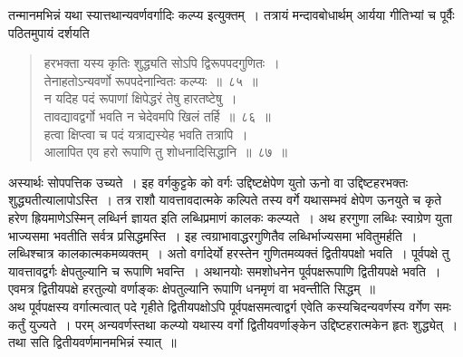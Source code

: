 \documentclass[11pt, openany]{book}
\begin{document}
\vspace{-3mm}
 तन्मानमभिन्नं यथा स्यात्तथान्यवर्णवर्गादिः कल्प्य इत्युक्तम्~। 
तत्रायं मन्दावबोधार्थम् आर्यया गीतिभ्यां च पूर्वैः पठितमुपायं दर्शयति\textendash 
 \begin{quote}
     \bs
      हरभक्ता यस्य कृतिः शुद्ध्यति सोऽपि द्विरूपपदगुणितः~। \\
 तेनाहतोऽन्यवर्णो रूपपदेनान्वितः कल्प्यः~॥~८५~॥~\\

\vspace{-5mm}
 न यदिह पदं रूपाणां क्षिपेद्धरं तेषु हारतष्टेषु~। \\
 तावद्यावद्वर्गो भवति न चेदेवमपि खिलं तर्हि~॥~८६~॥~\\

\vspace{-5mm}
 हत्वा क्षिप्त्वा च पदं यत्राद्यस्येह भवति तत्रापि~। \\
 आलापित एव हरो रूपाणि तु शोधनादिसिद्धानि~॥~८७~॥~
 \end{quote}

अस्यार्थः सोपपत्तिक उच्यते~। इह वर्गकुट्टके को वर्गः उद्दिष्टक्षेपेण
युतो ऊनो वा उद्दिष्टहरभक्तः शुद्ध्यतीत्यालापोऽस्ति~। तत्र राशौ 
यावत्तावदात्मके कल्पिते तस्य वर्गे यथासम्भवं क्षेपेण ऊनयुते च कृते 
हरेण ह्रियमाणेऽस्मिन् लब्धिर्न ज्ञायत इति लब्धिप्रमाणं कालकः 
कल्प्यते~। अथ हरगुणा लब्धिः स्वाग्रेण युता भाज्यसमा भवतीति 
सर्वत्र प्रसिद्धमस्ति~। इह त्वग्राभावाद्धरगुणितैव लब्धिर्भाज्यसमा भवितुमर्हति~। 
लब्धिश्चात्र कालकात्मकमव्यक्तम्~। अतो वर्गादेर्यो हरस्तेन गुणितमव्यक्तं
द्वितीयपक्षो भवति~। पूर्वपक्षे तु यावत्तावद्वर्गः क्षेपतुल्यानि च रूपाणि
भवन्ति~। अथानयोः समशोधनेन पूर्वपक्षरूपाणि द्वितीयपक्षे भवति~। एवमत्र
\newpage
\noindent द्वितीयपक्षे हरतुल्यो वर्णाङ्कः क्षेपतुल्यानि रूपाणि धनमृणं वा भवन्तीति
सिद्धम्~॥ \\

 \vspace{-3mm}
 अथ पूर्वपक्षस्य वर्गात्मत्वात् पदे गृहीते द्वितीयपक्षोऽपि पूर्वपक्षसमत्वाद्वर्ग एवेति कस्यचिदन्यवर्णस्य वर्गेण समः कर्तुं युज्यते~।
परम् अन्यवर्णस्तथा कल्प्यो यथास्य वर्गो द्वितीयवर्णाङ्केन उद्दिष्टहरात्मकेन हृतः 
शुद्ध्येत्~। तथा सति द्वितीयवर्णमानमभिन्नं स्यात्~॥ \\
\end{document}
